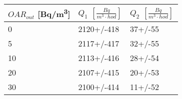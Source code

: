 \begin{tabular}{lll}
\toprule
$OAR_{out}$ [\si{Bq/m^3}] & $Q_1$ $\left[\si{\frac{Bq}{m^3\cdot hod}}\right]$ & $Q_2$ $\left[\si{\frac{Bq}{m^3\cdot hod}}\right]$ \\
\midrule
0  &                                        2120+/-418 &                                           37+/-55 \\
5  &                                        2117+/-417 &                                           32+/-55 \\
10 &                                        2113+/-416 &                                           28+/-54 \\
20 &                                        2107+/-415 &                                           20+/-53 \\
30 &                                        2100+/-414 &                                           11+/-52 \\
\bottomrule
\end{tabular}
